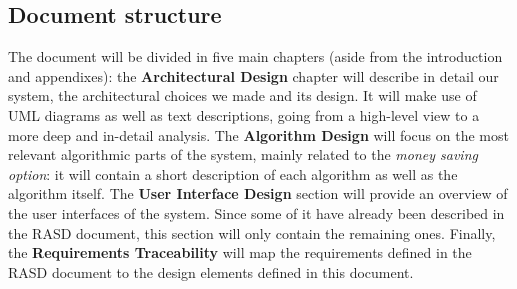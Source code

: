 \subsection{Document structure}
The document will be divided in five main chapters (aside from the introduction and appendixes): the \textbf{Architectural Design} chapter will describe in detail our system, the architectural choices we made and its design. It will make use of UML diagrams as well as text descriptions, going from a high-level view to a more deep and in-detail analysis. The \textbf{Algorithm Design} will focus on the most relevant algorithmic parts of the system, mainly related to the \textit{money saving option}: it will contain a short description of each algorithm as well as the algorithm itself. 
The \textbf{User Interface Design} section will provide an overview of the user interfaces of the system. Since some of it have already been described in the RASD document, this section will only contain the remaining ones. 
Finally, the \textbf{Requirements Traceability} will map the requirements defined in the RASD document to the design elements defined in this document.